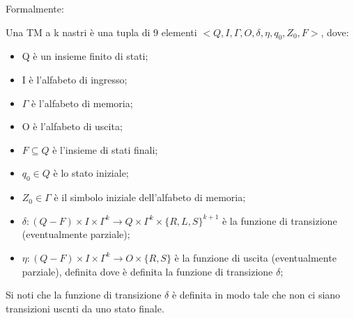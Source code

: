   Formalmente:
  \begin{definition} \label{TM}
    Una TM a k nastri è una tupla di 9 elementi \(<Q, I, \Gamma, O, \delta, \eta, q_0, Z_0, F>\), dove:
    \begin{itemize}
      \item Q è un insieme finito di stati;
      \item I è l'alfabeto di ingresso;
      \item \(\Gamma\) è l'alfabeto di memoria;
      \item O è l'alfabeto di uscita;
      \item \(F \subseteq Q\) è l'insieme di stati finali;
      \item \(q_0 \in Q\) è lo stato iniziale;
      \item \(Z_0\in \Gamma\) è il simbolo iniziale dell'alfabeto di memoria;
      \item \(\delta:(Q-F)\times I\times\Gamma^k\to Q\times\Gamma^k\times\{R,L,S\}^{k+1} \) è la funzione di transizione (eventualmente parziale);
      \item \(\eta:(Q-F)\times I\times \Gamma^k \to O\times\{R,S\}\) è la funzione di uscita (eventualmente parziale), definita dove è definita la funzione di transizione \(\delta\);
    \end{itemize}
  \end{definition}

  Si noti che la funzione di transizione \(\delta\) è definita in modo tale che non ci siano transizioni uscnti da uno stato finale.

